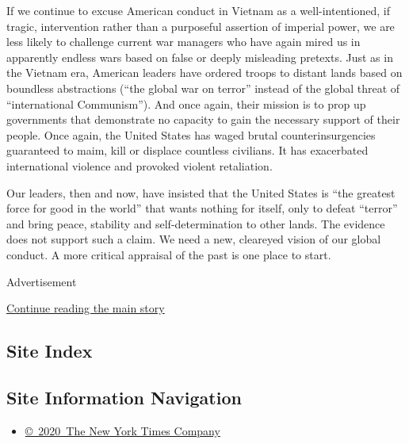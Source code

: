 If we continue to excuse American conduct in Vietnam as a
well-intentioned, if tragic, intervention rather than a purposeful
assertion of imperial power, we are less likely to challenge current war
managers who have again mired us in apparently endless wars based on
false or deeply misleading pretexts. Just as in the Vietnam era,
American leaders have ordered troops to distant lands based on boundless
abstractions (``the global war on terror'' instead of the global threat
of ``international Communism''). And once again, their mission is to
prop up governments that demonstrate no capacity to gain the necessary
support of their people. Once again, the United States has waged brutal
counterinsurgencies guaranteed to maim, kill or displace countless
civilians. It has exacerbated international violence and provoked
violent retaliation.

Our leaders, then and now, have insisted that the United States is ``the
greatest force for good in the world'' that wants nothing for itself,
only to defeat ``terror'' and bring peace, stability and
self-determination to other lands. The evidence does not support such a
claim. We need a new, cleareyed vision of our global conduct. A more
critical appraisal of the past is one place to start.

Advertisement

\protect\hyperlink{after-bottom}{Continue reading the main story}

\hypertarget{site-index}{%
\subsection{Site Index}\label{site-index}}

\hypertarget{site-information-navigation}{%
\subsection{Site Information
Navigation}\label{site-information-navigation}}

\begin{itemize}
\tightlist
\item
  \href{https://help.nytimes3xbfgragh.onion/hc/en-us/articles/115014792127-Copyright-notice}{©~2020~The
  New York Times Company}
\end{itemize}

